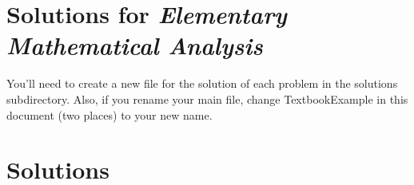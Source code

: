 \documentclass[9pt,twoside]{book}
\begin{document}
 \frontmatter

 \chapter*{Solutions for \emph{Elementary Mathematical Analysis}}

 You'll need to create a new file for the solution of each problem in the
 solutions subdirectory.  Also, if you rename your main file,
 change TextbookExample in this document (two places) to your new name.

 \cleardoublepage

 \setcounter{tocdepth}{1}
 \tableofcontents

 \mainmatter
 \pagestyle{fancy}


\chapter{Solutions}
\renewcommand{\theenumi}{\alph{enumi}}
\begin{multicols}{2}

\end{multicols}
\end{document}
